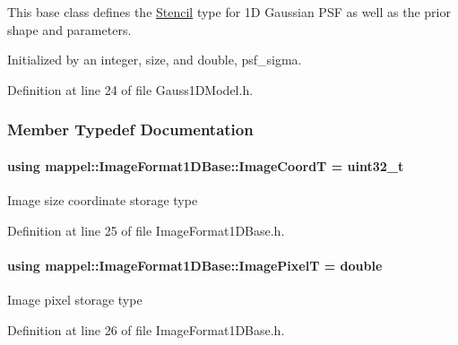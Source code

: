 This base class defines the \hyperlink{classmappel_1_1Gauss1DModel_1_1Stencil}{Stencil} type for 1D Gaussian P\+SF as well as the prior shape and parameters.

Initialized by an integer, size, and double, psf\+\_\+sigma. 

Definition at line 24 of file Gauss1\+D\+Model.\+h.



\subsubsection{Member Typedef Documentation}
\paragraph[{\texorpdfstring{Image\+CoordT}{ImageCoordT}}]{\setlength{\rightskip}{0pt plus 5cm}using {\bf mappel\+::\+Image\+Format1\+D\+Base\+::\+Image\+CoordT} =  uint32\+\_\+t\hspace{0.3cm}{\ttfamily [inherited]}}\hypertarget{classmappel_1_1ImageFormat1DBase_a82ab3168eb1a87eaeb3e7c919188e9fc}{}\label{classmappel_1_1ImageFormat1DBase_a82ab3168eb1a87eaeb3e7c919188e9fc}
Image size coordinate storage type 

Definition at line 25 of file Image\+Format1\+D\+Base.\+h.

\paragraph[{\texorpdfstring{Image\+PixelT}{ImagePixelT}}]{\setlength{\rightskip}{0pt plus 5cm}using {\bf mappel\+::\+Image\+Format1\+D\+Base\+::\+Image\+PixelT} =  double\hspace{0.3cm}{\ttfamily [inherited]}}\hypertarget{classmappel_1_1ImageFormat1DBase_a156fe500fd249cb4b77bdb0abc0dd0ea}{}\label{classmappel_1_1ImageFormat1DBase_a156fe500fd249cb4b77bdb0abc0dd0ea}
Image pixel storage type 

Definition at line 26 of file Image\+Format1\+D\+Base.\+h.

